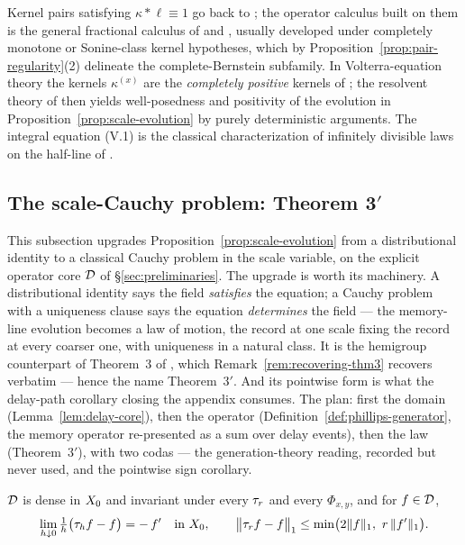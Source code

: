 \begin{remark}[literature]\label{rem:sonine-literature}
Kernel pairs satisfying $\kappa * \ell \equiv 1$ go back to ; the
operator calculus built on them is the general fractional calculus of
 and , usually developed under
completely monotone or Sonine-class kernel hypotheses, which by
Proposition~\ref{prop:pair-regularity}(2) delineate the complete-Bernstein subfamily. In
Volterra-equation theory the kernels $\kappa^{(x)}$ are the \emph{completely positive}
kernels of ; the resolvent theory of
 then yields well-posedness and positivity of the evolution in
Proposition~\ref{prop:scale-evolution} by purely deterministic arguments. The integral
equation (V.1) is the classical characterization of infinitely divisible laws on the
half-line of .
\end{remark}

\subsection{The scale-Cauchy problem: Theorem 3$'$}\label{sec:appendix-cauchy}

This subsection upgrades Proposition~\ref{prop:scale-evolution} from a distributional
identity to a classical Cauchy problem in the scale variable, on the explicit operator core
$\mathcal{D}$ of \S\ref{sec:preliminaries}. The upgrade is worth its machinery. A distributional
identity says the field \emph{satisfies} the equation; a Cauchy problem with a uniqueness
clause says the equation \emph{determines} the field --- the memory-line evolution becomes a law of motion,
the record at one scale fixing the record at every coarser one, with uniqueness in a
natural class. It is the hemigroup counterpart of Theorem~3 of
, which Remark~\ref{rem:recovering-thm3} recovers verbatim
--- hence the name Theorem~3$'$. And its pointwise form is what the delay-path corollary
closing the appendix consumes. The plan: first the domain (Lemma~\ref{lem:delay-core}),
then the operator (Definition~\ref{def:phillips-generator}, the memory operator
re-presented as a sum over delay events), then the law (Theorem~3$'$), with two codas ---
the generation-theory reading, recorded but never used, and the pointwise sign corollary.

\begin{lemma}\label{lem:delay-core}
$\mathcal{D}$ is dense in $X_0$ and invariant under every $\tau_r$ and every $\Phi_{x,y}$, and for
$f \in \mathcal{D}$,
\[
  \lim_{h \downarrow 0} \tfrac{1}{h}\bigl(\shift_h f - f\bigr) = -\,f' \quad \text{in } \Xz,
  \qquad
  \bigl\|\shift_r f - f\bigr\|_1 \le \min\bigl(2\|f\|_1,\ r\,\|f'\|_1\bigr).
\]
\end{lemma}

